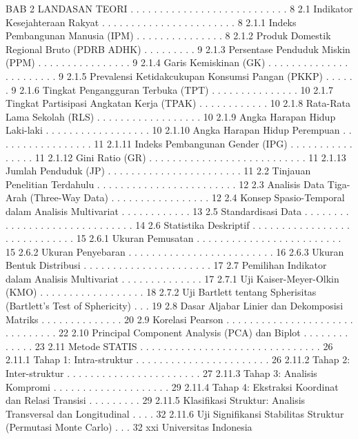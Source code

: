 BAB 2 LANDASAN TEORI . . . . . . . . . . . . . . . . . . . . . . . . . . . 8
2.1 Indikator Kesejahteraan Rakyat . . . . . . . . . . . . . . . . . . . . . . . 8
2.1.1 Indeks Pembangunan Manusia (IPM) . . . . . . . . . . . . . . . 8
2.1.2 Produk Domestik Regional Bruto (PDRB ADHK) . . . . . . . . . 9
2.1.3 Persentase Penduduk Miskin (PPM) . . . . . . . . . . . . . . . . 9
2.1.4 Garis Kemiskinan (GK) . . . . . . . . . . . . . . . . . . . . . . . 9
2.1.5 Prevalensi Ketidakcukupan Konsumsi Pangan (PKKP) . . . . . . 9
2.1.6 Tingkat Pengangguran Terbuka (TPT) . . . . . . . . . . . . . . . 10
2.1.7 Tingkat Partisipasi Angkatan Kerja (TPAK) . . . . . . . . . . . . 10
2.1.8 Rata-Rata Lama Sekolah (RLS) . . . . . . . . . . . . . . . . . . 10
2.1.9 Angka Harapan Hidup Laki-laki . . . . . . . . . . . . . . . . . . 10
2.1.10 Angka Harapan Hidup Perempuan . . . . . . . . . . . . . . . . . 11
2.1.11 Indeks Pembangunan Gender (IPG) . . . . . . . . . . . . . . . . 11
2.1.12 Gini Ratio (GR) . . . . . . . . . . . . . . . . . . . . . . . . . . . 11
2.1.13 Jumlah Penduduk (JP) . . . . . . . . . . . . . . . . . . . . . . . 11
2.2 Tinjauan Penelitian Terdahulu . . . . . . . . . . . . . . . . . . . . . . . . 12
2.3 Analisis Data Tiga-Arah (Three-Way Data) . . . . . . . . . . . . . . . . . 12
2.4 Konsep Spasio-Temporal dalam Analisis Multivariat . . . . . . . . . . . . 13
2.5 Standardisasi Data . . . . . . . . . . . . . . . . . . . . . . . . . . . . . . 14
2.6 Statistika Deskriptif . . . . . . . . . . . . . . . . . . . . . . . . . . . . . 15
2.6.1 Ukuran Pemusatan . . . . . . . . . . . . . . . . . . . . . . . . . 15
2.6.2 Ukuran Penyebaran . . . . . . . . . . . . . . . . . . . . . . . . . 16
2.6.3 Ukuran Bentuk Distribusi . . . . . . . . . . . . . . . . . . . . . . 17
2.7 Pemilihan Indikator dalam Analisis Multivariat . . . . . . . . . . . . . . 17
2.7.1 Uji Kaiser-Meyer-Olkin (KMO) . . . . . . . . . . . . . . . . . . 18
2.7.2 Uji Bartlett tentang Spherisitas (Bartlett’s Test of Sphericity) . . . 19
2.8 Dasar Aljabar Linier dan Dekomposisi Matriks . . . . . . . . . . . . . . 20
2.9 Korelasi Pearson . . . . . . . . . . . . . . . . . . . . . . . . . . . . . . . 22
2.10 Principal Component Analysis (PCA) dan Biplot . . . . . . . . . . . . . 23
2.11 Metode STATIS . . . . . . . . . . . . . . . . . . . . . . . . . . . . . . . 26
2.11.1 Tahap 1: Intra-struktur . . . . . . . . . . . . . . . . . . . . . . . 26
2.11.2 Tahap 2: Inter-struktur . . . . . . . . . . . . . . . . . . . . . . . 27
2.11.3 Tahap 3: Analisis Kompromi . . . . . . . . . . . . . . . . . . . . 29
2.11.4 Tahap 4: Ekstraksi Koordinat dan Relasi Transisi . . . . . . . . . 29
2.11.5 Klasifikasi Struktur: Analisis Transversal dan Longitudinal . . . . 32
2.11.6 Uji Signifikansi Stabilitas Struktur (Permutasi Monte Carlo) . . . 32
xxi Universitas Indonesia

